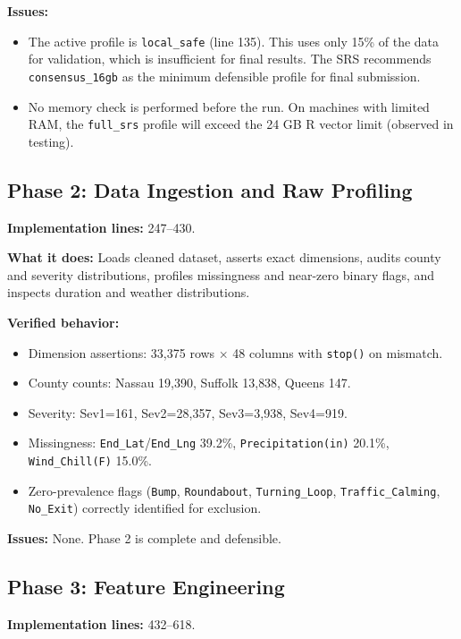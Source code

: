 \documentclass[11pt]{article}
\begin{document}
\textbf{Issues:}
\begin{itemize}
\item The active profile is \texttt{local\_safe} (line 135). This uses only 15\% of the
  data for validation, which is insufficient for final results. The SRS recommends
  \texttt{consensus\_16gb} as the minimum defensible profile for final submission.
\item No memory check is performed before the run. On machines with limited RAM,
  the \texttt{full\_srs} profile will exceed the 24 GB R vector limit
  (observed in testing).
\end{itemize}

\subsection{Phase 2: Data Ingestion and Raw Profiling}

\textbf{Implementation lines:} 247--430.

\textbf{What it does:} Loads cleaned dataset, asserts exact dimensions, audits
county and severity distributions, profiles missingness and near-zero binary
flags, and inspects duration and weather distributions.

\textbf{Verified behavior:}
\begin{itemize}
\item Dimension assertions: 33{,}375 rows $\times$ 48 columns with \texttt{stop()}
  on mismatch.
\item County counts: Nassau 19{,}390, Suffolk 13{,}838, Queens 147.
\item Severity: Sev1=161, Sev2=28{,}357, Sev3=3{,}938, Sev4=919.
\item Missingness: \texttt{End\_Lat}/\texttt{End\_Lng} 39.2\%, \texttt{Precipitation(in)}
  20.1\%, \texttt{Wind\_Chill(F)} 15.0\%.
\item Zero-prevalence flags (\texttt{Bump}, \texttt{Roundabout}, \texttt{Turning\_Loop},
  \texttt{Traffic\_Calming}, \texttt{No\_Exit}) correctly identified for exclusion.
\end{itemize}

\textbf{Issues:} None. Phase 2 is complete and defensible.

\subsection{Phase 3: Feature Engineering}

\textbf{Implementation lines:} 432--618.
\end{document}
